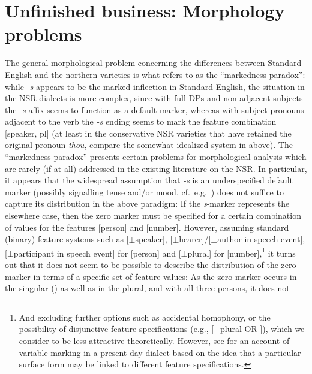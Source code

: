 \documentclass[output=paper]{langsci/langscibook}
\begin{document}
\section{Unfinished business: Morphology problems}
\label{sec:post-synt-appr}

The general morphological problem concerning the differences between Standard
English and the northern varieties is what \citet{Pietsch:2005b} refers to as
the ``markedness paradox'': while \emph{-s} appears to be the marked inflection
in Standard English, the situation in the \gls{NSR}
dialects is more complex,
since with full DPs and non-adjacent subjects the \emph{-s} affix seems to
function as a default marker, whereas with subject pronouns adjacent to the verb
the \emph{-s} ending seems to mark the feature combination [\textminus speaker, \textminus pl] (at
least in the conservative \gls{NSR} varieties that have retained the original
\Ssg{} pronoun \emph{thou}, compare the somewhat idealized system in 
above). The ``markedness paradox'' presents certain problems for morphological
analysis which are rarely (if at all) addressed in the existing literature on
the \gls{NSR}. In particular, it appears that the widespread assumption that
\emph{-s} is an underspecified default marker (possibly signalling tense and/or
mood, cf.\ e.g.\
\citealt{Henry:1995,Pietsch:2005b,deHaas:2011,deHaasandvanKemenade:2015}) does not suffice to capture its distribution in the above
paradigm: If the \emph{s}-marker represents the elsewhere\is{Elsewhere Condition} case, then the
zero marker must be specified for a certain combination of values for the
features [person] and [number]. However, assuming standard (binary) feature
systems such as [$\pm$speaker], [$\pm$hearer]/[$\pm$author in speech event],
[$\pm$participant in speech event] for [person] and [$\pm$plural] for
[number],\footnote{And excluding further options such as accidental homophony,
    or the possibility of disjunctive feature specifications  (e.g., [+plural OR
    \Fsg]), which we consider to be less attractive theoretically. However, see
    \textcite{AdgerSmith2010} for an account of variable \isi{agreement} marking in a
    present-day dialect based on the idea that a particular surface form may be
linked to different feature specifications.} it turns out that it does not seem
to be possible to describe the distribution of the zero marker in terms of a
specific set of feature values: As the zero marker occurs in the singular
(\Fsg{}) as well as in the plural, and with all three persons, it does not
\end{document}
